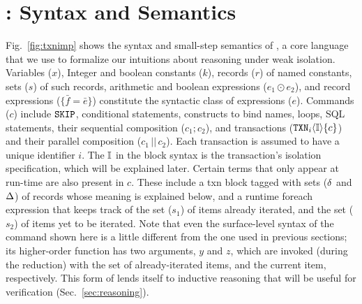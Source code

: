\section{\txnimp: Syntax and Semantics}
\label{sec:opsem}

\label{sec:syntax}



Fig.~\ref{fig:txnimp} shows the syntax and small-step semantics of
\txnimp, a core language that we use to formalize our intuitions about
reasoning under weak isolation. Variables ($x$), Integer and boolean
constants ($k$), records ($r$) of named constants, sets ($s$) of such
records, arithmetic and boolean expressions ($e_1 \odot e_2$), and
record expressions ($\{\bar{f}=\bar{e}\}$) constitute the syntactic
class of expressions ($e$). Commands ($c$) include ${\tt SKIP}$,
conditional statements,  constructs to bind names, 
loops, SQL statements, their sequential composition ($c_1;c_2$), and
transactions (${\tt TXN}_{i}\langle \mathbb{I} \rangle\{c\}$) and their parallel composition
($c_1\,||\,c_2$). Each transaction is assumed to have a unique
identifier $i$. The $\mathbb{I}$ in the  block syntax is the
transaction's isolation specification, which will be explained later.
Certain terms that only appear at run-time are also present in $c$.
These include a {\sf txn} block tagged with sets ($\delta$ and $\Delta$) of
records whose meaning is explained below, and a runtime {\sf foreach}
expression that keeps track of the set ($s_1$) of items already
iterated, and the set ($s_2$) of items yet to be iterated. Note that
even the surface-level syntax of the  command shown here is
a little different from the one used in previous sections; its
higher-order function has two arguments, $y$ and $z$, which are
invoked (during the reduction) with the set of already-iterated items,
and the current item, respectively. This form of  lends
itself to inductive reasoning that will be useful for verification
(Sec.~\ref{sec:reasoning}).


